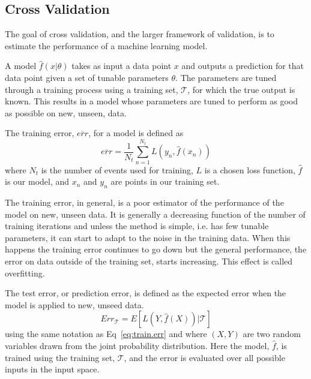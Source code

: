 
%
%
%
%

\subsection{Cross Validation}

The goal of cross validation, and the larger framework of validation, is to estimate the performance of a machine learning model.

A model $\hat{f}(x | \theta)$ takes as input a data point $x$ and outputs a prediction for that data point given a set of tunable parameters $\theta$. The parameters are tuned through a training process using a training set, $\mathcal{T}$, for which the true output is known. This results in a model whose parameters are tuned to perform as good as possible on new, unseen, data.

The training error, $\overline{err}$, for a model is defined as
\begin{equation}
\overline{err} = \frac{1}{N_t}\sum_{n=1}^{N_t}L(y_n, \hat{f}(x_n))
\label{eq:train.err}
\end{equation}
where $N_t$ is the number of events used for training, $L$ is a chosen loss function, $\hat{f}$ is our model, and $x_n$ and $y_n$ are points in our training set.

The training error, in general, is a poor estimator of the performance of the model on new, unseen data. It is generally a decreasing function of the number of training iterations and unless the method is simple, i.e. has few tunable parameters, it can start to adapt to the noise in the training data. When this happens the training error continues to go down but the general performance, the error on data outside of the training set, starts increasing. This effect is called overfitting.

The test error, or prediction error, is defined as the expected error when the model is applied to new, unseed data.
\begin{equation}
Err_{\mathcal{T}} = E\left[L(Y,\hat{f}(X)) | \mathcal{T} \right]
\end{equation}
using the same notation as Eq~\ref{eq:train.err} and where $(X, Y)$ are two random variables drawn from the joint probability distribution. Here the model, $\hat{f}$, is trained using the training set, $\mathcal{T}$, and the error is evaluated over all possible inputs in the input space.


